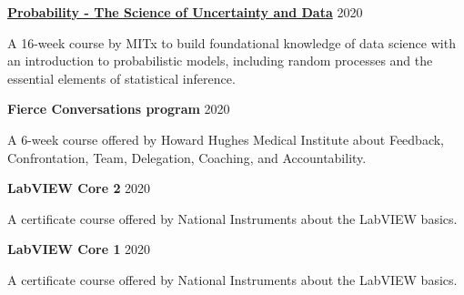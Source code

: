 \documentclass[margin,line]{res}
\begin{document}
\begin{resume}
\vspace*{-2mm}

{\bf \href{https://www.edx.org/course/probability-the-science-of-uncertainty-and-data}{Probability - The Science of Uncertainty and Data}} \hfill {2020}\\
\vspace*{-3.5mm}
\begin{addmargin}[0pt]{.1\linewidth}
\vspace*{-1mm}
A 16-week course by MITx to build foundational knowledge of data science with an introduction to probabilistic models, including random processes and the essential elements of statistical inference.
\end{addmargin}

\vspace*{-2mm}

{\bf Fierce Conversations program} \hfill {2020}\\
\vspace*{-3.5mm}
\begin{addmargin}[0pt]{.1\linewidth}
\vspace*{-1mm}
A 6-week course offered by Howard Hughes Medical Institute about Feedback, Confrontation, Team, Delegation, Coaching, and Accountability.
\end{addmargin}

\vspace*{-2mm}

{\bf LabVIEW Core 2} \hfill {2020}\\
\vspace*{-3.5mm}
\begin{addmargin}[0pt]{.1\linewidth}
\vspace*{-1mm}
A certificate course offered by National Instruments about the LabVIEW basics.
\end{addmargin}

\vspace*{-2mm}

{\bf LabVIEW Core 1} \hfill {2020}\\
\vspace*{-3.5mm}
\begin{addmargin}[0pt]{.1\linewidth}
\vspace*{-1mm}
A certificate course offered by National Instruments about the LabVIEW basics.
\end{addmargin}

\vspace*{-2mm}


\end{resume}
\end{document}
